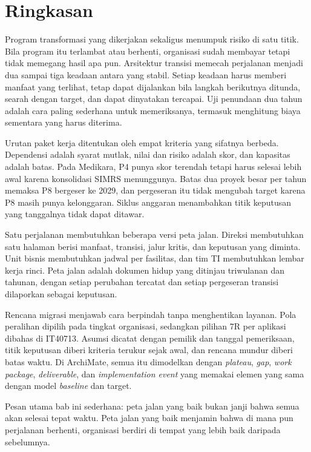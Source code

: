 \section{Ringkasan}

Program transformasi yang dikerjakan sekaligus menumpuk risiko di satu titik.
Bila program itu terlambat atau berhenti, organisasi sudah membayar tetapi
tidak memegang hasil apa pun. Arsitektur transisi memecah perjalanan menjadi
dua sampai tiga keadaan antara yang stabil. Setiap keadaan harus memberi
manfaat yang terlihat, tetap dapat dijalankan bila langkah berikutnya ditunda,
searah dengan target, dan dapat dinyatakan tercapai. Uji penundaan dua tahun
adalah cara paling sederhana untuk memeriksanya, termasuk menghitung biaya
sementara yang harus diterima.

Urutan paket kerja ditentukan oleh empat kriteria yang sifatnya berbeda.
Dependensi adalah syarat mutlak, nilai dan risiko adalah skor, dan kapasitas
adalah batas. Pada Medikara, P4 punya skor terendah tetapi harus selesai lebih
awal karena konsolidasi SIMRS menunggunya. Batas dua proyek besar per tahun
memaksa P8 bergeser ke 2029, dan pergeseran itu tidak mengubah target karena
P8 masih punya kelonggaran. Siklus anggaran menambahkan titik keputusan yang
tanggalnya tidak dapat ditawar.

Satu perjalanan membutuhkan beberapa versi peta jalan. Direksi membutuhkan satu
halaman berisi manfaat, transisi, jalur kritis, dan keputusan yang diminta.
Unit bisnis membutuhkan jadwal per fasilitas, dan tim TI membutuhkan lembar
kerja rinci. Peta jalan adalah dokumen hidup yang ditinjau triwulanan dan
tahunan, dengan setiap perubahan tercatat dan setiap pergeseran transisi
dilaporkan sebagai keputusan.

Rencana migrasi menjawab cara berpindah tanpa menghentikan layanan. Pola
peralihan dipilih pada tingkat organisasi, sedangkan pilihan 7R per aplikasi
dibahas di IT40713. Asumsi dicatat dengan pemilik dan tanggal pemeriksaan,
titik keputusan diberi kriteria terukur sejak awal, dan rencana mundur diberi
batas waktu. Di ArchiMate, semua itu dimodelkan dengan \textit{plateau},
\textit{gap}, \textit{work package}, \textit{deliverable}, dan
\textit{implementation event} yang memakai elemen yang sama dengan model
\textit{baseline} dan target.

Pesan utama bab ini sederhana: peta jalan yang baik bukan janji bahwa semua
akan selesai tepat waktu. Peta jalan yang baik menjamin bahwa di mana pun
perjalanan berhenti, organisasi berdiri di tempat yang lebih baik daripada
sebelumnya.

